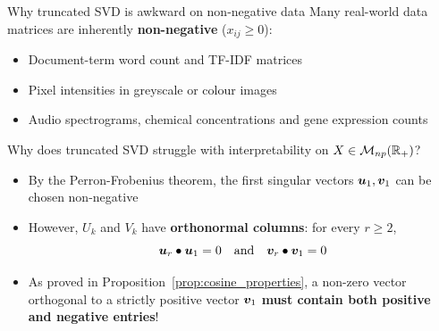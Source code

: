 \documentclass[aspectratio=169]{beamer}\usepackage[]{graphicx}\usepackage[]{xcolor}
\begin{document}
\begin{frame}{Why truncated SVD is awkward on non-negative data}
Many real-world data matrices are inherently \textbf{non-negative} ($x_{ij} \ge 0$):
\begin{itemize}
\item Document-term word count and TF-IDF matrices
\item Pixel intensities in greyscale or colour images
\item Audio spectrograms, chemical concentrations and gene expression counts
\end{itemize}
\vfill
Why does truncated SVD struggle with interpretability on $X \in \mathcal{M}_{np}(\mathbb{R}_+)$?
\begin{itemize}
\item By the Perron-Frobenius theorem, the first singular vectors $\bm{u}_1, \bm{v}_1$ can be chosen non-negative
\item However, $U_k$ and $V_k$ have \textbf{orthonormal columns}: for every $r \ge 2$,
\[
\bm{u}_r \bullet \bm{u}_1 = 0 \quad\textrm{and}\quad \bm{v}_r \bullet \bm{v}_1 = 0
\]
\item As proved in Proposition~\ref{prop:cosine_properties}, a non-zero vector orthogonal to a strictly positive vector $\bm{v}_1$ \textbf{must contain both positive and negative entries}!
\end{itemize}
\end{frame}
\end{document}
